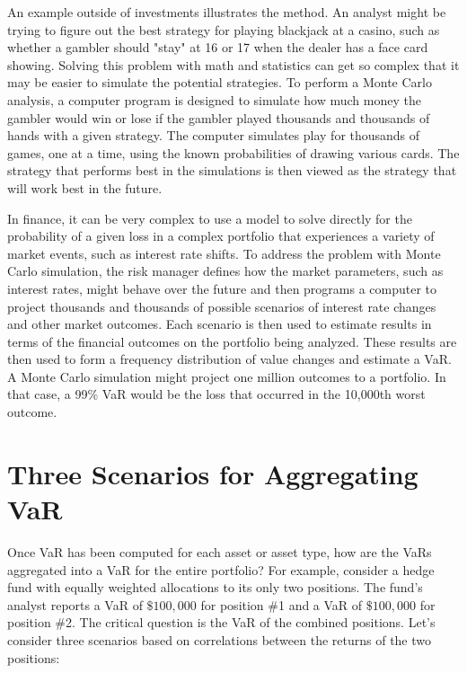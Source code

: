 \documentclass[11pt]{article}
\begin{document}
An example outside of investments illustrates the method. An analyst might be trying to figure out the best strategy for playing blackjack at a casino, such as whether a gambler should "stay" at 16 or 17 when the dealer has a face card showing. Solving this problem with math and statistics can get so complex that it may be easier to simulate the potential strategies. To perform a Monte Carlo analysis, a computer program is designed to simulate how much money the gambler would win or lose if the gambler played thousands and thousands of hands with a given strategy. The computer simulates play for thousands of games, one at a time, using the known probabilities of drawing various cards. The strategy that performs best in the simulations is then viewed as the strategy that will work best in the future.

In finance, it can be very complex to use a model to solve directly for the probability of a given loss in a complex portfolio that experiences a variety of market events, such as interest rate shifts. To address the problem with Monte Carlo simulation, the risk manager defines how the market parameters, such as interest rates, might behave over the future and then programs a computer to project thousands and thousands of possible scenarios of interest rate changes and other market outcomes. Each scenario is then used to estimate results in terms of the financial outcomes on the portfolio being analyzed. These results are then used to form a frequency distribution of value changes and estimate a VaR. A Monte Carlo simulation might project one million outcomes to a portfolio. In that case, a 99\% VaR would be the loss that occurred in the 10,000th worst outcome.

\section*{Three Scenarios for Aggregating VaR}
Once VaR has been computed for each asset or asset type, how are the VaRs aggregated into a VaR for the entire portfolio? For example, consider a hedge fund with equally weighted allocations to its only two positions. The fund's analyst reports a VaR of $\$ 100,000$ for position \#1 and a VaR of $\$ 100,000$ for position \#2. The critical question is the VaR of the combined positions. Let's consider three scenarios based on correlations between the returns of the two positions:
\end{document}
